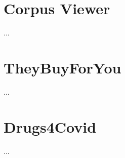 \section{Corpus Viewer}
\label{sec:corpus-viewer}
...

\section{TheyBuyForYou}
\label{sec:tbfy}
...

\section{Drugs4Covid}
\label{sec:drugs4covid}
...